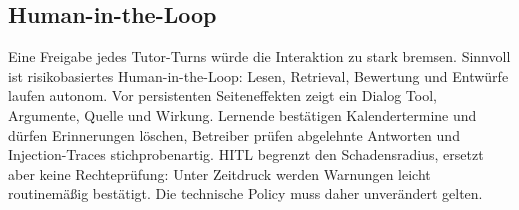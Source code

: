 \subsection{Human-in-the-Loop}

Eine Freigabe jedes Tutor-Turns würde die Interaktion zu stark bremsen. Sinnvoll
ist risikobasiertes Human-in-the-Loop: Lesen, Retrieval, Bewertung und Entwürfe
laufen autonom. Vor persistenten Seiteneffekten zeigt ein Dialog Tool,
Argumente, Quelle und Wirkung. Lernende bestätigen Kalendertermine und dürfen
Erinnerungen löschen, Betreiber prüfen abgelehnte Antworten und
Injection-Traces stichprobenartig. HITL begrenzt den Schadensradius, ersetzt
aber keine Rechteprüfung: Unter Zeitdruck werden Warnungen leicht routinemäßig
bestätigt. Die technische Policy muss daher unverändert gelten.
